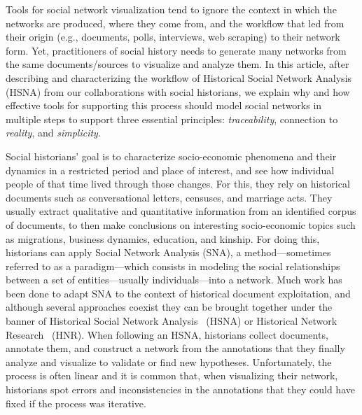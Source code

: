 
Tools for social network visualization tend to ignore the context in which the networks are produced, where they come from, and the workflow that led from their origin (e.g., documents, polls, interviews, web scraping) to their network form.
Yet, practitioners of social history needs to generate many networks from the same documents/sources to visualize and analyze them.
In this article, after describing and characterizing the workflow of Historical Social Network Analysis~\cite{wetherellHistoricalSocialNetwork1998} (HSNA) from our collaborations with social historians, we explain why and how effective tools for supporting this process should model social networks in multiple steps to support three essential principles: \emph{traceability}, connection to \emph{reality}, and \emph{simplicity}.

Social historians' goal is to characterize socio-economic phenomena and their dynamics in a restricted period and place of interest, and see how individual people of that time lived through those changes.
For this, they rely on historical documents such as conversational letters, censuses, and marriage acts.
They usually extract qualitative and quantitative information from an identified corpus of documents, to then make conclusions on interesting socio-economic topics such as migrations, business dynamics, education, and kinship.
For doing this, historians can apply Social Network Analysis (SNA), a method---sometimes referred to as a paradigm---which consists in modeling the social relationships between a set of entities---usually individuals---into a network.
Much work has been done to adapt SNA to the context of historical document exploitation, and although several approaches coexist they can be brought together under the banner of Historical Social Network Analysis~\cite{wetherellHistoricalSocialNetwork1998} (HSNA) or Historical Network Research~\cite{kerschbaumerPowerNetworksProspects2015} (HNR).
When following an HSNA, historians collect documents, annotate them, and construct a network from the annotations that they finally analyze and visualize to validate or find new hypotheses.
Unfortunately, the process is often linear and it is common that, when visualizing their network, historians spot errors and inconsistencies in the annotations that they could have fixed if the process was iterative.

